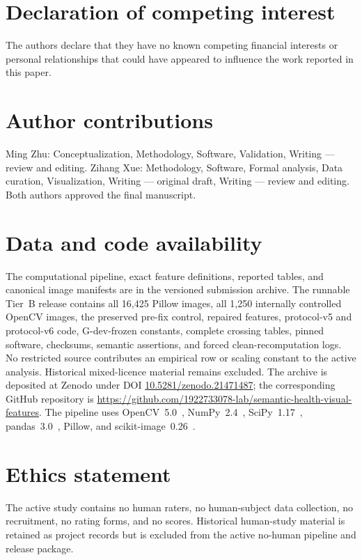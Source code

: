 \documentclass[preprint,12pt]{elsarticle}
\begin{document}








\section*{Declaration of competing interest}
The authors declare that they have no known competing financial interests or personal relationships that could have appeared to influence the work reported in this paper.

\section*{Author contributions}
Ming Zhu: Conceptualization, Methodology, Software, Validation, Writing --- review and editing. Zihang Xue: Methodology, Software, Formal analysis, Data curation, Visualization, Writing --- original draft, Writing --- review and editing. Both authors approved the final manuscript.

\section*{Data and code availability}
The computational pipeline, exact feature definitions, reported tables, and canonical image manifests are in the versioned submission archive. The runnable Tier~B release contains all 16,425 Pillow images, all 1,250 internally controlled OpenCV images, the preserved pre-fix control, repaired features, protocol-v5 and protocol-v6 code, G-dev-frozen constants, complete crossing tables, pinned software, checksums, semantic assertions, and forced clean-recomputation logs. No restricted source contributes an empirical row or scaling constant to the active analysis. Historical mixed-licence material remains excluded. The archive is deposited at Zenodo under DOI \href{https://doi.org/10.5281/zenodo.21471487}{10.5281/zenodo.21471487}; the corresponding GitHub repository is \url{https://github.com/1922733078-lab/semantic-health-visual-features}. The pipeline uses OpenCV~5.0~\citep{opencv2000}, NumPy~2.4~\citep{harris2020numpy}, SciPy~1.17~\citep{virtanen2020scipy}, pandas~3.0~\citep{mckinney2010pandas}, Pillow, and scikit-image~0.26~\citep{vanderwalt2014scikitimage}.

\section*{Ethics statement}
The active study contains no human raters, no human-subject data collection, no recruitment, no rating forms, and no scores. Historical human-study material is retained as project records but is excluded from the active no-human pipeline and release package.
\end{document}
